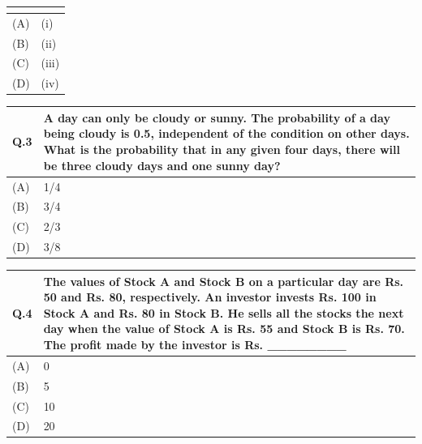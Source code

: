 \documentclass[14pt]{article}
\renewcommand{\arraystretch}{1.25}
\begin{document}
\begin{tabular}{|p{1.5cm}|p{12cm}|}
\begin{center}
\begin{tikzpicture}[scale=0.75,transform shape]
\end{tikzpicture}

\end{center}

\\
\hline

(A) & (i)\\
\hline
(B) & (ii)\\
\hline
(C) & (iii)\\
\hline
(D) & (iv)\\
\hline

\end{tabular}

\vspace{0.5cm}

\renewcommand{\arraystretch}{1.8}

\newpage

\begin{tabular}{|p{1.5cm}|p{12cm}|}
\hline

\textbf{Q.3} &
A day can only be cloudy or sunny. The probability of a day being cloudy is 0.5, independent of the condition on other days. What is the probability that in any given four days, there will be three cloudy days and one sunny day?
\\

\hline
(A) & 1/4 \\
\hline
(B) & 3/4 \\
\hline
(C) & 2/3 \\
\hline
(D) & 3/8 \\
\hline

\end{tabular}

\vspace{0.5cm}

\begin{tabular}{|p{1.5cm}|p{12cm}|}
\hline

\textbf{Q.4} &
The values of Stock A and Stock B on a particular day are Rs. 50 and Rs. 80, respectively. An investor invests Rs. 100 in Stock A and Rs. 80 in Stock B. He sells all the stocks the next day when the value of Stock A is Rs. 55 and Stock B is Rs. 70. The profit made by the investor is Rs. \_\_\_\_\_\_\_\_
\\

\hline
(A) & 0 \\
\hline
(B) & 5 \\
\hline
(C) & 10 \\
\hline
(D) & 20 \\
\hline

\end{tabular}
\end{document}
